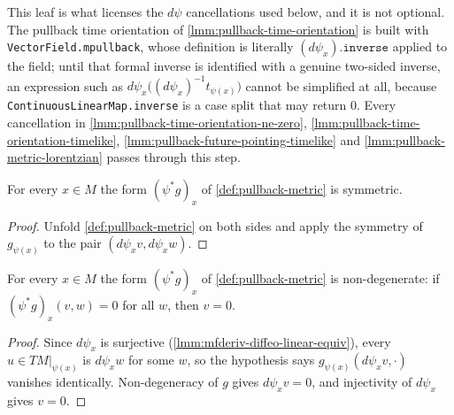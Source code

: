 This leaf is what licenses the $d\psi$ cancellations used below, and it is not optional. The pullback time orientation of \ref{lmm:pullback-time-orientation} is built with \texttt{VectorField.mpullback}, whose definition is literally $(d\psi_x).\mathtt{inverse}$ applied to the field; until that formal inverse is identified with a genuine two-sided inverse, an expression such as $d\psi_x\big((d\psi_x)^{-1} t_{\psi(x)}\big)$ cannot be simplified at all, because \texttt{ContinuousLinearMap.inverse} is a case split that may return $0$. Every cancellation in \ref{lmm:pullback-time-orientation-ne-zero}, \ref{lmm:pullback-time-orientation-timelike}, \ref{lmm:pullback-future-pointing-timelike} and \ref{lmm:pullback-metric-lorentzian} passes through this step.

\begin{lemma}
    \label{lmm:pullback-metric-symm}
    \leanok
    For every $x \in M$ the form $(\psi^*g)_x$ of \ref{def:pullback-metric} is symmetric.
\end{lemma}
\begin{proof}
    \leanok
    Unfold \ref{def:pullback-metric} on both sides and apply the symmetry of $g_{\psi(x)}$ to the pair $(d\psi_x v, d\psi_x w)$.
\end{proof}

\begin{lemma}
    \label{lmm:pullback-metric-nondegenerate}
    \leanok
    For every $x \in M$ the form $(\psi^*g)_x$ of \ref{def:pullback-metric} is non-degenerate: if $(\psi^*g)_x(v,w) = 0$ for all $w$, then $v = 0$.
\end{lemma}
\begin{proof}
    \leanok
    Since $d\psi_x$ is surjective (\ref{lmm:mfderiv-diffeo-linear-equiv}), every $u \in TM|_{\psi(x)}$ is $d\psi_x w$ for some $w$, so the hypothesis says $g_{\psi(x)}(d\psi_x v, \cdot)$ vanishes identically. Non-degeneracy of $g$ gives $d\psi_x v = 0$, and injectivity of $d\psi_x$ gives $v = 0$.
\end{proof}

